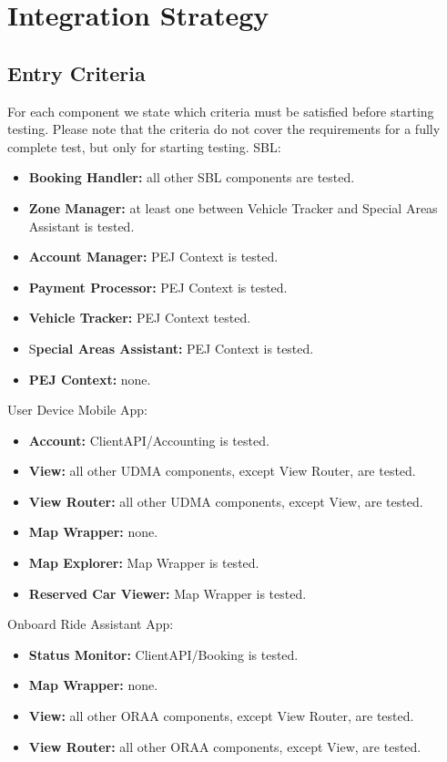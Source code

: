 \section{Integration Strategy}

\subsection{Entry Criteria}
For each component we state which criteria must be satisfied before starting testing. Please note that the criteria do not cover the requirements for a fully complete test, but only for starting testing.
SBL:
\begin{itemize}
    \item \textbf{Booking Handler:} all other SBL components are tested.
    \item \textbf{Zone Manager:} at least one between Vehicle Tracker and Special Areas Assistant is tested.
    \item \textbf{Account Manager:} PEJ Context is tested.
    \item \textbf{Payment Processor:} PEJ Context is tested.
    \item \textbf{Vehicle Tracker:} PEJ Context tested.
    \item S\textbf{pecial Areas Assistant:} PEJ Context is tested.
    \item \textbf{PEJ Context:} none.
\end{itemize}
User Device Mobile App:
\begin{itemize}
    \item \textbf{Account:} ClientAPI/Accounting is tested.
    \item \textbf{View:} all other UDMA components, except View Router, are tested.
    \item \textbf{View Router:} all other UDMA components, except View, are tested.
    \item \textbf{Map Wrapper:} none.
    \item \textbf{Map Explorer:} Map Wrapper is tested.
    \item \textbf{Reserved Car Viewer:} Map Wrapper is tested.
\end{itemize}
Onboard Ride Assistant App:
\begin{itemize}
    \item \textbf{Status Monitor:} ClientAPI/Booking is tested.
    \item \textbf{Map Wrapper:} none.
    \item \textbf{View:} all other ORAA components, except View Router, are tested.
    \item \textbf{View Router:} all other ORAA components, except View, are tested.
\end{itemize}
